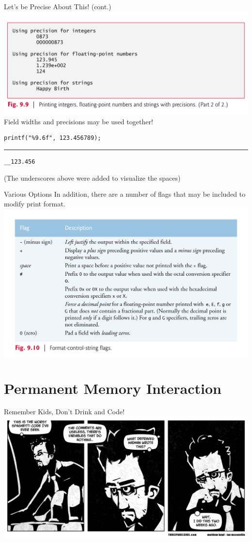\documentclass[11pt]{beamer}
\begin{document}
\begin{frame}[fragile=singleslide]{Let's be Precise About This! (cont.)}
\center
\includegraphics[scale=0.12]{prec2.png}
\flushleft
Field widths and precisions may be used together! 
\begin{lstlisting}[style = C]
printf("%9.6f", 123.456789);
\end{lstlisting}
\hrule
\begin{lstlisting}[style=terminal]
__123.456
\end{lstlisting}
(The underscores above were added to visualize the spaces)
\end{frame}


\begin{frame}{Various Options}
In addition, there are a number of flags that may be included to modify print format.
\center
\includegraphics[scale=0.10]{flags.png}
\end{frame}

\section[File I/O]{Permanent Memory Interaction}
\begin{frame}{Remember Kids, Don't Drink and Code!}
\center
\includegraphics[scale=0.3]{comments.png}
\end{frame}
\end{document}
